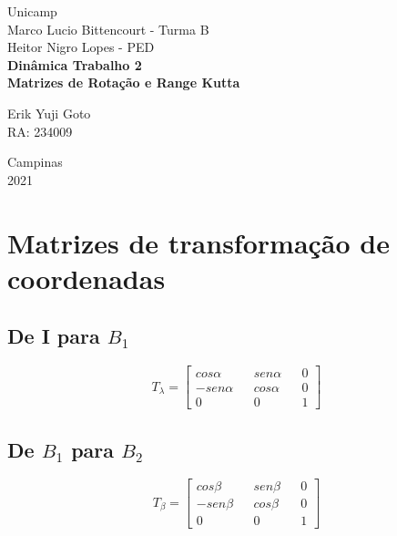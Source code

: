 \documentclass[a4paper, 12pt]{article}
\begin{document}
%
\begin{titlepage} %
	\begin{center} %
		{\large Unicamp}\\[0.4cm] %
		{\large Marco Lucio Bittencourt - Turma B}\\
		{\large Heitor Nigro Lopes - PED}\\[3.2cm]
		{\bf \huge Dinâmica Trabalho 2}\\[0.2cm] 
		{\bf \large Matrizes de Rotação e Range Kutta}\\[4.9cm]
	\end{center} %
	{\large Erik Yuji Goto}\\ %
	RA: 234009\\[10cm]
	\begin{center}
	
		{\large Campinas}\\[0.2cm]
		{\large 2021}
	\end{center}
\end{titlepage} %


\tableofcontents
\newpage

\section{Matrizes de transformação de coordenadas}
	\subsection{De I para $B_1$}
	\begin{equation}
		T_{\lambda} = \begin{bmatrix}
			cos\alpha && sen\alpha && 0\\
			-sen\alpha && cos\alpha && 0\\
			0 && 0 && 1
		\end{bmatrix}
	\end{equation}
	
	\subsection{De $B_1$ para $B_2$}
	\begin{equation}
		T_{\beta} = \begin{bmatrix}
			cos\beta && sen\beta && 0\\
			-sen\beta && cos\beta && 0\\
			0 && 0 && 1
		\end{bmatrix}
	\end{equation}
	
\end{document}
